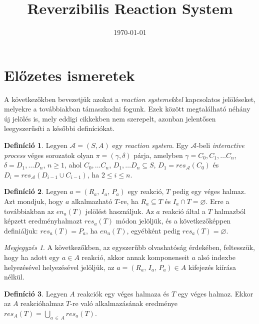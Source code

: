 \documentclass[12pt]{article}
\title{Reverzibilis Reaction System}
\date{\today}
\theoremstyle{definition}
\newtheorem{definition}{Definíció}
\theoremstyle{remark}
\newtheorem*{remark*}{Megjegyzés}
\theoremstyle{plain}
\theoremstyle{remark}
\theoremstyle{plain}
\let\emptyset\varnothing
\newcommand{\en}{\textit{en}}
\newcommand{\res}{\textit{res}}
\newcommand{\reaction}[3]{
    (#1, \, #2, \, #3)
}
\begin{document}
    \maketitle

    \section*{Előzetes ismeretek}

    A következőkben bevezetjük azokat a \textit{reaction systemekkel} kapcsolatos jelöléseket, melyekre a továbbiakban támaszkodni fogunk. Ezek között megtalálható néhány új jelölés is, mely eddigi cikkekben nem szerepelt, azonban jelentősen leegyszerűsíti a későbbi definíciókat.

    \begin{definition}
        Legyen $\mathscr{A} = (S, A)$ egy \textit{reaction system}. Egy $\mathscr{A}$-beli \textit{interactive process} véges sorozatok olyan $\pi = (\gamma, \delta)$ párja, amelyben $\gamma = C_{0}, C_{1}, \ldots C_{n}$, $\delta = D_{1}, \ldots D_{n}$, $n \geq 1$, ahol $C_{0}, \ldots C_{n}$, $D_{1}, \ldots D_{n} \subseteq S$, $D_{1} = \textit{res}_{\mathscr{A}}(C_{0})$ és $D_{i} = \textit{res}_{\mathscr{A}}(D_{i - 1} \cup C_{i - 1})$, ha $2 \leq i \leq n$.
    \end{definition}

    \begin{definition}
        Legyen $a = \reaction{R_{a}}{I_{a}}{P_{a}}$ egy reakció, $T$ pedig egy véges halmaz. Azt mondjuk, hogy $a$ alkalmazható $T$-re, ha $R_{a} \subseteq T$ és $I_{a} \cap T = \emptyset$. Erre a továbbiakban az $\en_{a}(T)$ jelölést használjuk. Az $a$ reakció által a $T$ halmazból képzett eredményhalmazt $\res_{a}(T)$ módon jelöljük, és a következőképpen definiáljuk: $\res_{a}(T) = P_{a}$, ha $\en_{a}(T)$, egyébként pedig $\res_{a}(T) = \emptyset$.
    \end{definition}

    \begin{remark*}
        A következőkben, az egyszerűbb olvashatóság érdekében, feltesszük, hogy ha adott egy $a \in A$ reakció, akkor annak komponenseit $a$ alsó indexbe helyezésével helyezésével jelöljük, az $a = \reaction{R_{a}}{I_{a}}{P_{a}} \in A$ kifejezés kiírása nélkül.
    \end{remark*}

    \begin{definition}
        Legyen $A$ reakciók egy véges halmaza és $T$ egy véges halmaz. Ekkor az $A$ reakcióhalmaz $T$-re való alkalmazásának eredménye $\res_{A}(T) = \bigcup_{a \,\in\, A}\res_{a}(T)$.
    \end{definition}
\end{document}
